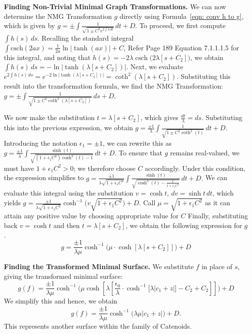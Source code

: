 \documentclass[12pt]{article}
\theoremstyle{plain}
\theoremstyle{definition}
\theoremstyle{remark}
\begin{document}
\textbf{Finding Non-Trivial Minimal Graph Transformations.} We can now determine the NMG Transformation \(g\) directly using Formula~\ref{eqn: conv h to g}, which is given by  \(g = \pm \int \frac{1}{\sqrt{1 \pm C^2 e^{2\int h\, dt}}}\, dt + D.\) To proceed, we first compute \(\int h(s)\, ds\).  Recalling the standard integral \(\int \text{csch}(2ax)=\tfrac{1}{2a}\ln|\tanh(ax)|+C\), Refer \cite{JD} Page 189 Equation 7.1.1.1.5 for this integral, and noting that \(h(s)=-2\lambda\operatorname{csch}\big(2\lambda[s+C_2]\big)\), we obtain  
\(\int h(s)\, ds = -\ln|\tanh(\lambda[s+C_2])|\). Next, we evaluate \(e^{2\int h(s)\, ds} = e^{-2\ln|\tanh(\lambda[s+C_2])|} = \coth^2(\lambda[s+C_2]).\) Substituting this result into the transformation formula, we find the NMG Transformation: \(g = \pm \int \frac{1}{\sqrt{1 \pm C^2\coth^2(\lambda[s+C_2])}}\, ds + D.\)

We now make the substitution \(t = \lambda[s + C_2]\), which gives \(\tfrac{dt}{\lambda} = ds\). Substituting this into the previous expression, we obtain  \(g = \tfrac{\pm 1}{\lambda} \int \frac{1}{\sqrt{1 \pm C^2 \coth^2(t)}}\, dt + D.\)
Introducing the notation \(\epsilon_1 = \pm 1\), we can rewrite this as  \(g = \tfrac{\pm 1}{\lambda} \int \frac{\sinh(t)}{\sqrt{(1 + \epsilon_1 C^2)\cosh^2(t) - 1}}\, dt + D.\) To ensure that \(g\) remains real-valued, we must have \(1 + \epsilon_1 C^2 > 0\); we therefore choose \(C\) accordingly.  Under this condition, the expression simplifies to  \(g = \tfrac{\pm 1}{\lambda \sqrt{1 + \epsilon_1 C^2}} \int \frac{\sinh(t)}{\sqrt{\cosh^2(t) - \tfrac{1}{1 + \epsilon_1 C^2}}}\, dt + D.\) We can evaluate this integral using the substitution \(v = \cosh t\), \(dv = \sinh t\, dt\), which yields  \(g = \tfrac{\pm 1}{\lambda \sqrt{1 + \epsilon_1 C^2}} \cosh^{-1}\!\big(v \sqrt{1 + \epsilon_1 C^2}\big) + D.\) Call \(\mu=\sqrt{1 +\epsilon_1 C^2}\) as it can attain any positive value by choosing appropriate value for \(C\) Finally, substituting back \(v = \cosh t\) and then \(t = \lambda[s + C_2]\), we obtain the following expression for \(g\).
\[
 \boxed{ g = \frac{\pm1}{\lambda\mu}\cosh^{-1}\big(\mu\cdot\cosh[\lambda[s+C_2]]\big)+D}
\] 

\textbf{Finding the Transformed Minimal Surface.}  
We substitute \(f\) in place of \(s\), giving the transformed minimal surface:  
\[
  g(f) =  \frac{\pm1}{\lambda\mu}\cosh^{-1}\big(\mu\cosh[\lambda[\frac{\epsilon_0}{\lambda}\cdot \cosh^{-1}\Big[\lambda|c_1 +  z|\Big]-C_2+C_2]]\big)+D
\]
We simplify this and hence, we obtain  
\[
\boxed{g(f) = \frac{\pm1}{\lambda\mu}\cosh^{-1}\big(\lambda\mu|c_1 +  z|\big)+D.}
\]
This represents another surface within the family of Catenoids.
\end{document}
